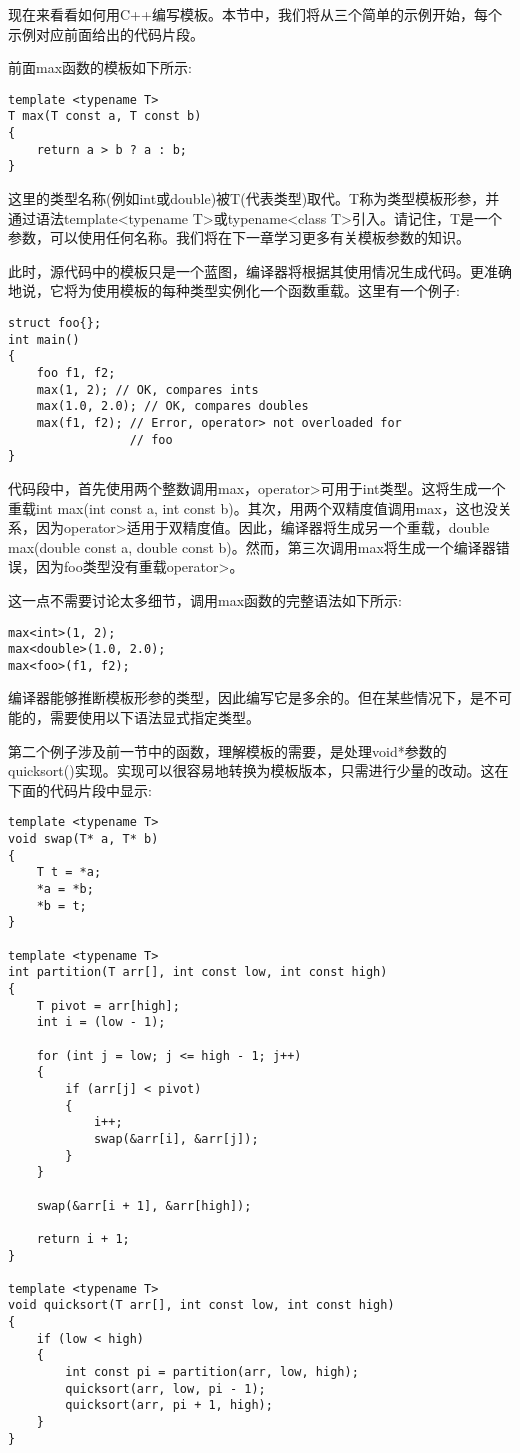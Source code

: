 现在来看看如何用C++编写模板。本节中，我们将从三个简单的示例开始，每个示例对应前面给出的代码片段。

前面max函数的模板如下所示:

\begin{lstlisting}[style=styleCXX]
template <typename T>
T max(T const a, T const b)
{
	return a > b ? a : b;
}
\end{lstlisting}

这里的类型名称(例如int或double)被T(代表类型)取代。T称为类型模板形参，并通过语法template<typename T>或typename<class T>引入。请记住，T是一个参数，可以使用任何名称。我们将在下一章学习更多有关模板参数的知识。

此时，源代码中的模板只是一个蓝图，编译器将根据其使用情况生成代码。更准确地说，它将为使用模板的每种类型实例化一个函数重载。这里有一个例子:

\begin{lstlisting}[style=styleCXX]
struct foo{};
int main()
{
	foo f1, f2;
	max(1, 2); // OK, compares ints
	max(1.0, 2.0); // OK, compares doubles
	max(f1, f2); // Error, operator> not overloaded for
	             // foo
}
\end{lstlisting}

代码段中，首先使用两个整数调用max，operator>可用于int类型。这将生成一个重载int max(int const a, int const b)。其次，用两个双精度值调用max，这也没关系，因为operator>适用于双精度值。因此，编译器将生成另一个重载，double max(double const a, double const b)。然而，第三次调用max将生成一个编译器错误，因为foo类型没有重载operator>。

这一点不需要讨论太多细节，调用max函数的完整语法如下所示:

\begin{lstlisting}[style=styleCXX]
max<int>(1, 2);
max<double>(1.0, 2.0);
max<foo>(f1, f2);
\end{lstlisting}

编译器能够推断模板形参的类型，因此编写它是多余的。但在某些情况下，是不可能的，需要使用以下语法显式指定类型。

第二个例子涉及前一节中的函数，理解模板的需要，是处理void*参数的quicksort()实现。实现可以很容易地转换为模板版本，只需进行少量的改动。这在下面的代码片段中显示:

\begin{lstlisting}[style=styleCXX]
template <typename T>
void swap(T* a, T* b)
{
	T t = *a;
	*a = *b;
	*b = t;
}

template <typename T>
int partition(T arr[], int const low, int const high)
{
	T pivot = arr[high];
	int i = (low - 1);
	
	for (int j = low; j <= high - 1; j++)
	{
		if (arr[j] < pivot)
		{
			i++;
			swap(&arr[i], &arr[j]);
		}
	}

	swap(&arr[i + 1], &arr[high]);
	
	return i + 1;
}

template <typename T>
void quicksort(T arr[], int const low, int const high)
{
	if (low < high)
	{
		int const pi = partition(arr, low, high);
		quicksort(arr, low, pi - 1);
		quicksort(arr, pi + 1, high);
	}
}
\end{lstlisting}

